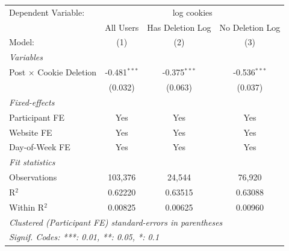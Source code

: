 \begin{tabular}{lccc}
   \tabularnewline \midrule \midrule
   Dependent Variable: & \multicolumn{3}{c}{log cookies}\\
                                  & All Users      & Has Deletion Log & No Deletion Log \\   
   Model:                         & (1)            & (2)              & (3)\\  
   \midrule
   \emph{Variables}\\
   Post $\times$ Cookie Deletion  & -0.481$^{***}$ & -0.375$^{***}$   & -0.536$^{***}$\\   
                                  & (0.032)        & (0.063)          & (0.037)\\   
   \midrule
   \emph{Fixed-effects}\\
   Participant FE                 & Yes            & Yes              & Yes\\  
   Website FE                     & Yes            & Yes              & Yes\\  
   Day-of-Week FE                 & Yes            & Yes              & Yes\\  
   \midrule
   \emph{Fit statistics}\\
   Observations                   & 103,376        & 24,544           & 76,920\\  
   R$^2$                          & 0.62220        & 0.63515          & 0.63088\\  
   Within R$^2$                   & 0.00825        & 0.00625          & 0.00960\\  
   \midrule \midrule
   \multicolumn{4}{l}{\emph{Clustered (Participant FE) standard-errors in parentheses}}\\
   \multicolumn{4}{l}{\emph{Signif. Codes: ***: 0.01, **: 0.05, *: 0.1}}\\
\end{tabular}
